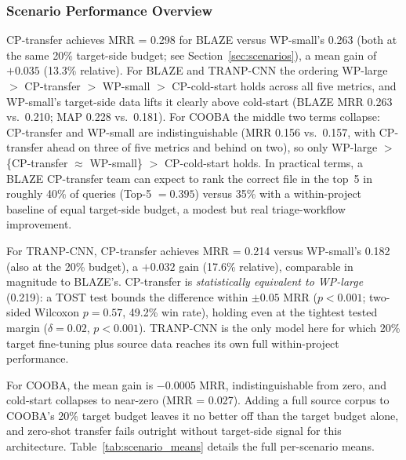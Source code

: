 \documentclass[a4paper,fleqn]{cas-dc}
\begin{document}
\subsubsection{Scenario Performance Overview}

 CP-transfer achieves MRR = 0.298 for BLAZE versus WP-small's 0.263 (both
at the same 20\% target-side budget; see
Section~\ref{sec:scenarios}), a mean gain of $+0.035$ (13.3\% relative). For
BLAZE and TRANP-CNN the ordering WP-large $>$ CP-transfer $>$ WP-small $>$
CP-cold-start holds across all five metrics, and WP-small's target-side data
lifts it clearly above cold-start (BLAZE MRR 0.263 vs.\ 0.210; MAP 0.228 vs.\
0.181). For COOBA the middle two terms collapse: CP-transfer and WP-small are
indistinguishable (MRR 0.156 vs.\ 0.157, with CP-transfer ahead on three of
five metrics and behind on two), so only WP-large $>$ \{CP-transfer $\approx$
WP-small\} $>$ CP-cold-start holds. In
practical terms, a BLAZE CP-transfer team can expect to rank the correct file in
the top~5 in roughly 40\% of queries (Top-5 $= 0.395$) versus 35\% with a
within-project baseline of equal target-side budget, a modest but real
triage-workflow improvement.

For TRANP-CNN, CP-transfer achieves MRR = 0.214 versus WP-small's 0.182 (also
at the 20\% budget), a $+0.032$ gain (17.6\% relative), comparable in
magnitude to BLAZE's.
CP-transfer is \emph{statistically equivalent to WP-large} (0.219):
a TOST test bounds the difference within $\pm 0.05$
MRR ($p < 0.001$; two-sided Wilcoxon $p = 0.57$, 49.2\% win rate), holding
even at the tightest tested margin ($\delta = 0.02$, $p < 0.001$). TRANP-CNN
is the only model here for which 20\% target fine-tuning plus source data
reaches its own full within-project performance.

 For COOBA, the mean gain is $-0.0005$ MRR, indistinguishable from zero, and
cold-start collapses to near-zero (MRR = 0.027). Adding a full source corpus to
COOBA's 20\% target budget leaves it no better off than the target budget alone,
and zero-shot transfer fails outright without target-side
signal for this architecture. Table~\ref{tab:scenario_means} details the
full per-scenario means.
\end{document}
